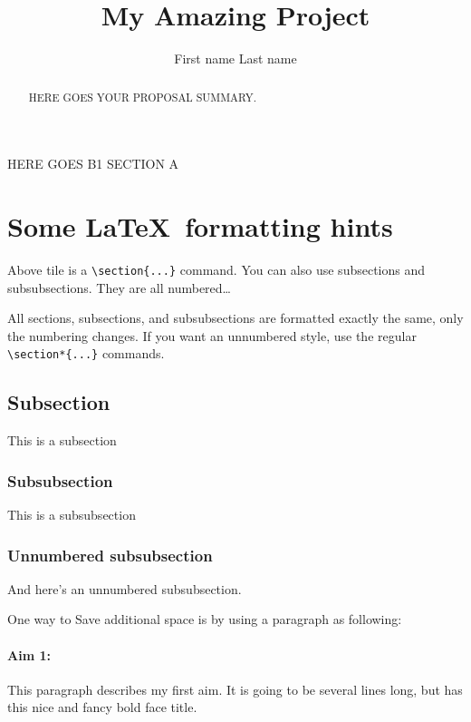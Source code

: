 \documentclass[11pt, a4paper]{article}
\author[Last name]{First name Last name}
\title{My Amazing Project}
\begin{document}
\maketitle



\begin{abstract}
HERE GOES YOUR PROPOSAL SUMMARY.
\end{abstract}



\begin{b1-sec-a}
HERE GOES B1 SECTION A

\section{Some \LaTeX\ formatting hints}

Above tile is a \verb=\section{...}= command. You can also use subsections and subsubsections. They are all numbered\dots

All sections, subsections, and subsubsections are formatted exactly the same, only the numbering changes. If you want an unnumbered style, use the regular \verb=\section*{...}= commands.

\subsection{Subsection}

This is a subsection 

\subsubsection{Subsubsection}

This is a subsubsection

\subsubsection*{Unnumbered subsubsection}
And here's an unnumbered subsubsection.

One way to Save additional space is by using a paragraph as following:

\paragraph{Aim 1:} This paragraph describes my first aim. It is going to be several lines long, but has this nice and fancy bold face title.
\end{b1-sec-a}
\end{document}
